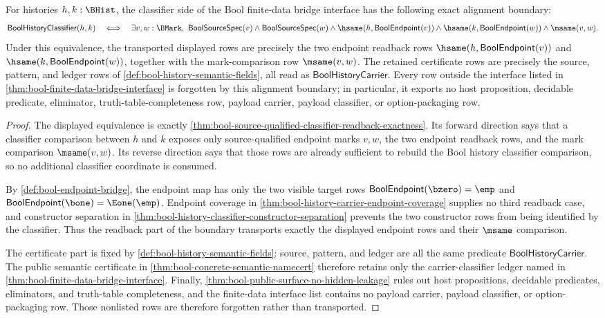 \begin{lemma}
\label{lem:bool-finite-data-classifier-alignment-boundary}
For histories $h,k:\BHist$, the classifier side of the Bool finite-data
bridge interface has the following exact alignment boundary:
$$
  \mathsf{BoolHistoryClassifier}(h,k)
  \quad\Longleftrightarrow\quad
  \exists v,w:\BMark,\
    \mathsf{BoolSourceSpec}(v)
    \land
    \mathsf{BoolSourceSpec}(w)
    \land
    \hsame(h,\mathsf{BoolEndpoint}(v))
    \land
    \hsame(k,\mathsf{BoolEndpoint}(w))
    \land
    \msame(v,w).
$$
Under this equivalence, the transported displayed rows are precisely the two
endpoint readback rows
$\hsame(h,\mathsf{BoolEndpoint}(v))$ and
$\hsame(k,\mathsf{BoolEndpoint}(w))$, together with the mark-comparison row
$\msame(v,w)$. The retained certificate rows are precisely the source,
pattern, and ledger rows of \autoref{def:bool-history-semantic-fields}, all
read as $\mathsf{BoolHistoryCarrier}$. Every row outside the interface listed
in \autoref{thm:bool-finite-data-bridge-interface} is forgotten by this
alignment boundary; in particular, it exports no host proposition, decidable
predicate, eliminator, truth-table-completeness row, payload carrier, payload
classifier, or option-packaging row.
\end{lemma}
\begin{proof}
The displayed equivalence is exactly
\autoref{thm:bool-source-qualified-classifier-readback-exactness}. Its forward
direction says that a classifier comparison between $h$ and $k$ exposes only
source-qualified endpoint marks $v,w$, the two endpoint readback rows, and the
mark comparison $\msame(v,w)$. Its reverse direction says that those rows are
already sufficient to rebuild the Bool history classifier comparison, so no
additional classifier coordinate is consumed.

By \autoref{def:bool-endpoint-bridge}, the endpoint map has only the two
visible target rows $\mathsf{BoolEndpoint}(\bzero)=\emp$ and
$\mathsf{BoolEndpoint}(\bone)=\Eone(\emp)$. Endpoint coverage in
\autoref{thm:bool-history-carrier-endpoint-coverage} supplies no third
readback case, and constructor separation in
\autoref{thm:bool-history-classifier-constructor-separation} prevents the two
constructor rows from being identified by the classifier. Thus the readback
part of the boundary transports exactly the displayed endpoint rows and their
$\msame$ comparison.

The certificate part is fixed by \autoref{def:bool-history-semantic-fields}:
source, pattern, and ledger are all the same predicate
$\mathsf{BoolHistoryCarrier}$. The public semantic certificate in
\autoref{thm:bool-concrete-semantic-namecert} therefore retains only the
carrier-classifier ledger named in \autoref{thm:bool-finite-data-bridge-interface}.
Finally, \autoref{thm:bool-public-surface-no-hidden-leakage} rules out host
propositions, decidable predicates, eliminators, and truth-table completeness,
and the finite-data interface list contains no payload carrier, payload
classifier, or option-packaging row. Those nonlisted rows are therefore
forgotten rather than transported.
\end{proof}

